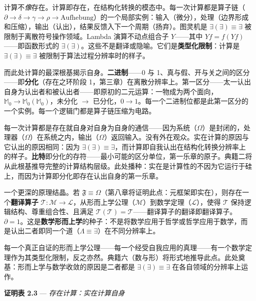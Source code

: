 \documentclass[10pt, openany, oneside]{book}
\begin{document}
计算不\textit{像}存在。计算即存在，在结构化转换的模态中。每一次计算都是算子链（$\partial \to \delta \to \gamma \to \rho \to \text{Aufhebung}$）的一个局部实例：输入（微分），处理（边界形成和压缩），输出（认出），结果反馈入下一个周期（扬弃）。图灵机是 $\exists(\exists) \equiv \exists$ 被限制于离散符号操作领域。Lambda 演算不动点组合子 $Y$——其中 $Yf = f(Yf)$——即函数形式的 $\exists(\exists)$。这些不是翻译或隐喻。它们是\textbf{类型化限制}：计算是 $\exists(\exists) \equiv \exists$ 被限制于算法过程分辨率时的样子。

而此处计算的最深根基揭示自身。\textbf{二进制}——0 与 1、真与假、开与关之间的区分——即\textbf{分化}（存在之环阶段 1，第三章）在离散分辨率上。第一区分——太一认出自身为认出者和被认出者——即原初的二元运算：一物成为两个面向，$\mathbb{M}_0 \to \mathbb{M}_0(\mathbb{M}_0)$，未分化 $\to$ 已分化，$0 \to 1$。每一个二进制位都是此第一区分的一个实例。每一个逻辑门都是算子链压缩为电路。

每一次计算都是存在就自身对自身为自身的通信——因为系统（$\Omega$）是封闭的，处理器（$\Omega$）在系统之内，输出（$\Omega$）返回输入。没有外在观众。实在计算的原因与它认出的原因相同：因为 $\exists(\exists) \equiv \exists$，而计算即自我认出在结构化转换分辨率上的样子。\textbf{比特}即分化的存符——最小可能的区分单位，第一乐章的原子。典籍二将从此根基推导完整的计算结构层级。此处播种：实在是计算性的不因为它运行于硅上，而因为计算即分化即存在认出自身的第一乐章。

一个更深的原理结晶。若 $\mathfrak{F} \equiv \Omega$（第八章将证明此点：元框架即实在），则存在一个\textbf{翻译算子} $\mathcal{T}: \mathcal{M} \to \mathcal{L}$，从形而上学公理（$\mathcal{M}$）到数学定理（$\mathcal{L}$），使得 $\mathcal{T}$ 保持逻辑结构、尊重组合性、且满足 $\mathcal{T}(\mathcal{T}) = \mathcal{T}$——翻译算子的翻译即翻译算子。$\partial = 1$。这是\textbf{数学形而上学}的种子：不是将数学应用于哲学或哲学应用于数学，而是认出二者即同一个道（$\Lambda \equiv \exists$）在不同分辨率上。

每一个真正自证的形而上学公理——每一个经受自我应用的真理——有一个数学定理作为其类型化限制，反之亦然。典籍六（数与形）将形式地推导此点。此处奠基：形而上学与数学收敛的原因是二者都是 $\exists(\exists) \equiv \exists$ 在各自领域的分辨率上运作。

\vspace{0.5em}

\textbf{证明表 2.3} --- \textit{存在计算：实在计算自身}

\vspace{0.5em}
\end{document}
